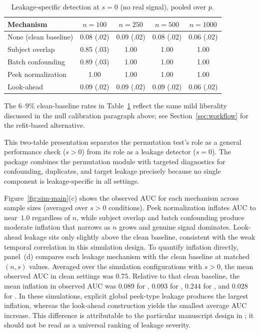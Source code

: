 \documentclass[article,shortnames]{jss}
\begin{document}
\begin{table}[tbp]
\centering
\caption{Leakage-specific detection at $s = 0$ (no real signal), pooled
over $p$.}
\label{tab:sim-s0}
\begin{tabular}{|l|c|c|c|c|}
\hline
\textbf{Mechanism} & \textbf{$n=100$} & \textbf{$n=250$} & \textbf{$n=500$} & \textbf{$n=1000$} \\
\hline
None (clean baseline) & 0.08 (.02) & 0.09 (.02) & 0.08 (.02) & 0.06 (.02) \\
\hline
Subject overlap & 0.85 (.03) & 1.00 & 1.00 & 1.00 \\
\hline
Batch confounding & 0.89 (.03) & 1.00 & 1.00 & 1.00 \\
\hline
Peek normalization & 1.00 & 1.00 & 1.00 & 1.00 \\
\hline
Look-ahead & 0.09 (.02) & 0.09 (.02) & 0.09 (.02) & 0.06 (.02) \\
\hline
\end{tabular}
\end{table}

\noindent
The $6$--$9\%$ clean-baseline rates in Table~\ref{tab:sim-s0} reflect the
same mild liberality discussed in the null calibration paragraph above; see
Section~\ref{sec:workflow} for the refit-based alternative.

This two-table presentation separates the permutation test's role as a general
performance check ($s > 0$) from its role as a leakage detector ($s = 0$). The
package combines the permutation module with targeted diagnostics for
confounding, duplicates, and target leakage precisely because no single
component is leakage-specific in all settings.

Figure~\ref{fig:sim-main}(c) shows the observed AUC for each mechanism across
sample sizes (averaged over $s > 0$ conditions). Peek normalization inflates
AUC to near~$1.0$ regardless of $n$, while subject overlap and batch
confounding produce moderate inflation that narrows as $n$ grows and genuine
signal dominates. Look-ahead leakage sits only slightly above the clean
baseline, consistent with the weak temporal correlation in this simulation
design. To quantify inflation directly, panel~(d) compares each leakage
mechanism with the clean baseline at matched $(n, s)$ values. Averaged over the
simulation configurations with $s > 0$, the mean observed AUC in clean settings was
$0.75$. Relative to that clean baseline, the mean inflation in observed AUC was
$0.089$ for , $0.093$ for
, $0.244$ for , and $0.028$ for
. In these simulations, explicit global peek-type leakage
produces the largest inflation, whereas the look-ahead construction yields the
smallest average AUC increase. This difference is attributable to the
particular manuscript design in ; it should not
be read as a universal ranking of leakage severity.
\end{document}
